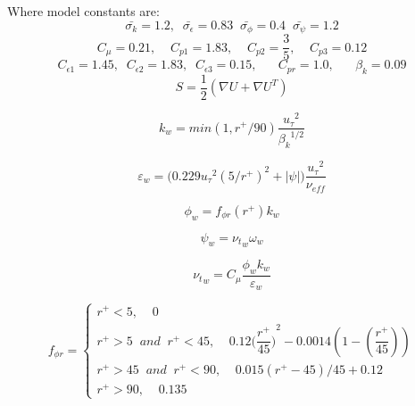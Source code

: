\vspace{1cm}

Where model constants are: 
\begin{equation*}
\bar{\sigma_{k}} = 1.2, \;\; \bar{\sigma_{\epsilon}} = 0.83 \;\; \bar{\sigma_{\phi}} = 0.4 \;\; \bar{\sigma_{\psi}} = 1.2
\end{equation*}
\begin{equation*}
C_{\mu} = 0.21, \;\;\;\; C_{p1} = 1.83,  \;\;\;\; C_{p2} = \dfrac{3}{5}, \;\;\;\; C_{p3} = 0.12
\end{equation*}
\begin{equation*}
C_{\epsilon 1} = 1.45, \;\; C_{\epsilon 2} = 1.83, \;\; C_{\epsilon 3} = 0.15, \;\;\;\;\;\; C_{pr} = 1.0, \;\;\;\;\;\; \beta_{k} = 0.09
\end{equation*}
\begin{equation*}
S = \dfrac{1}{2}(\nabla U + \nabla U^{T})
\end{equation*}


\normalsize

\cleardoublepage

\small

\begin{equation*}
k_{w} =  min(1,r^{+}/90) \dfrac{{u_{\tau}}^{2}}{{\beta_{k}}^{1/2}}
\end{equation*}

\begin{equation*}
\varepsilon_{w} =  \bigg(  0.229 {u_{\tau}}^{2} (5/r^{+})^{2}  + |\psi| \bigg) \dfrac{{u_{\tau}}^{2}}{\nu_{eff}}
\end{equation*}


\begin{equation*}
\phi_{w} =  f_{\phi r}(r^{+}) k_{w}
\end{equation*}


\begin{equation*}
\psi_{w} =  {\nu_{t}}_{w} \omega_{w}
\end{equation*}


\begin{equation*}
{\nu_{t}}_{w} = C_{\mu} \dfrac{{\phi}_{w} k_{w}}{\varepsilon_{w}}
\end{equation*}


\begin{equation*}
f_{\phi r}=
\begin{cases}
r^{+} < 5, \;\;\;\; 0\\
r^{+} > 5 \;\;and\;\; r^{+} < 45, \;\;\;\; 0.12 { \bigg( \dfrac{r^{+}}{45} \bigg) }^2 - 0.0014(1- (\dfrac{r^{+}}{45}))\\
r^{+} > 45 \;\;and\;\; r^{+} < 90, \;\;\;\; 0.015(r^{+} - 45)/45 + 0.12 \\
r^{+} > 90, \;\;\;\; 0.135
\end{cases}
\end{equation*}

